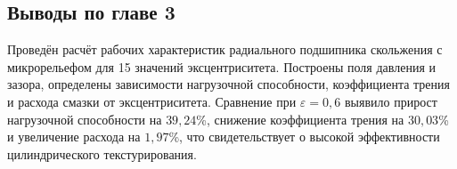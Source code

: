 \subsection*{Выводы по главе 3}
{}

Проведён расчёт рабочих характеристик радиального подшипника скольжения с \varDimpleTypeGenitive{} микрорельефом для 15 значений эксцентриситета. Построены поля давления и зазора, определены зависимости нагрузочной способности, коэффициента трения и расхода смазки от эксцентриситета. Сравнение при $\varepsilon = 0{,}6$ выявило прирост нагрузочной способности на $39{,}24$\%, снижение коэффициента трения на $30{,}03$\% и увеличение расхода на $1{,}97$\%, что свидетельствует о высокой эффективности цилиндрического текстурирования.
